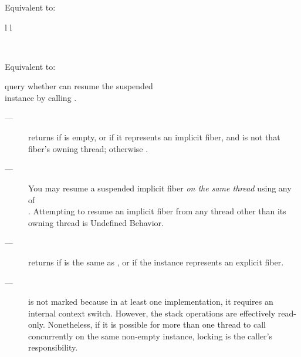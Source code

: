 \effects
Equivalent to:\\

\begin{tabular}{ l l }
    \midrule

    \\

    \midrule
\end{tabular}

\effects
Equivalent to:\\


\effects
query whether \currthread can resume the suspended\\
\fiber instance by calling \xtresumesome.

\returns
\begin{description}
    \item[---]  returns 
        if  is empty, or
        if it represents an implicit fiber,
        and \currthread is not that fiber's owning thread; otherwise .
\end{description}

\remarks
\begin{description}
    \item[---] You may resume a suspended implicit fiber \emph{on the same thread}
        using any of\\
        \allresume. Attempting to
        resume an implicit fiber from any thread other than its owning thread is Undefined Behavior.
    \item[---] \canxtresume returns  if \currthread is the same as \lastthread,
        or if the \fiber instance represents an explicit fiber.
    \item[---] \canxtresume is not marked  because in at least one
        implementation, it requires an internal context switch. However, the
        stack operations are effectively read-only. Nonetheless, if it is
        possible for more than one thread to call \canxtresume concurrently on
        the same non-empty \fiber instance, locking is the caller's responsibility.
\end{description}


